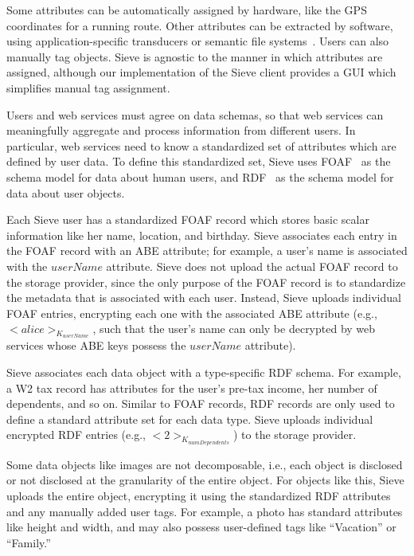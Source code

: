 Some attributes can be automatically assigned
by hardware, like the GPS coordinates for a
running route. Other attributes can be
extracted by software, using application-specific
transducers or semantic file systems~\cite{sfs,contextsfs,graphsfs}.
Users can also manually tag objects. Sieve is
agnostic to the manner in which attributes
are assigned, although our implementation of
the Sieve client provides a GUI which simplifies
manual tag assignment.

Users and web services must agree on data schemas,
so that web services can meaningfully aggregate
and process information from different users. In
particular, web services need to know a
standardized set of attributes which are defined
by user data. To define this standardized set,
Sieve uses FOAF~\cite{FOAF} as the schema %
model for data about human users, and RDF~\cite{RDF} %
as the schema model for data about user objects.

Each Sieve user has a standardized FOAF record
which stores basic scalar information like
her name, location, and birthday. Sieve
associates each entry in the FOAF record
with an ABE attribute; for example, a user's
name is associated with the $userName$ attribute.
Sieve does not upload the actual FOAF record
to the storage provider, since the only purpose
of the FOAF record is to standardize the
metadata that is associated with each user.
Instead, Sieve uploads individual FOAF
entries, encrypting each one with the associated
ABE attribute (e.g., $<alice>_{K_{userName}}$,
such that the user's name can only be
decrypted by web services whose ABE keys
possess the $userName$ attribute).

Sieve associates each data object with a
type-specific RDF schema. For example, a
W2 tax record has attributes for the user's
pre-tax income, her number of dependents,
and so on. Similar to FOAF records, RDF
records are only used to define a standard
attribute set for each data type. Sieve uploads 
individual encrypted RDF entries (e.g., $<2>_{K_{numDependents}}$)
to the storage provider.

Some data objects like images are not
decomposable, i.e., each object is disclosed
or not disclosed at the granularity of the
entire object. For objects like this, Sieve
uploads the entire object, encrypting it
using the standardized RDF attributes and
any manually added user tags. For example,
a photo has standard attributes like height
and width, and may also possess user-defined
tags like ``Vacation'' or ``Family.''

